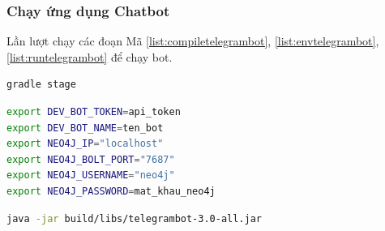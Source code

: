 \subsubsection{Chạy ứng dụng Chatbot}

Lần lượt chạy các đoạn Mã \ref{list:compiletelegrambot}, \ref{list:envtelegrambot}, \ref{list:runtelegrambot} để chạy bot. 

\begin{lstlisting}[language=bash,caption={Biên dịch mã nguồn},label={list:compiletelegrambot}]
gradle stage 
\end{lstlisting}

\begin{lstlisting}[language=bash,caption={Tạo các biến môi trường},label={list:envtelegrambot}]
export DEV_BOT_TOKEN=api_token
export DEV_BOT_NAME=ten_bot
export NEO4J_IP="localhost" 
export NEO4J_BOLT_PORT="7687"
export NEO4J_USERNAME="neo4j"
export NEO4J_PASSWORD=mat_khau_neo4j
\end{lstlisting}

\begin{lstlisting}[language=bash,caption={Chạy bot},label={list:runtelegrambot}]
java -jar build/libs/telegrambot-3.0-all.jar
\end{lstlisting}











